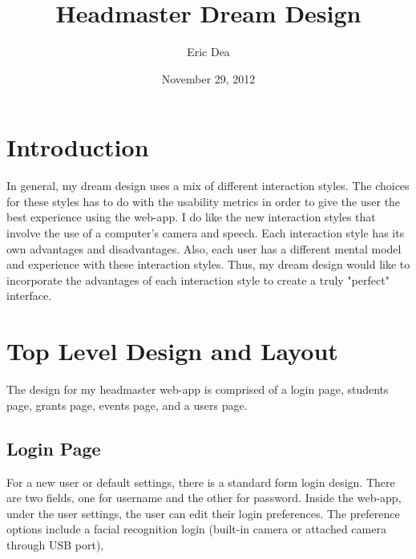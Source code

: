 \documentclass{article}
\title{Headmaster Dream Design}
\author{Eric Dea}
\date{November 29, 2012}
\begin{document}
\maketitle


\pagebreak
\tableofcontents

\pagebreak
\listoffigures

\pagebreak

%
%
\section{Introduction}
\label{introduction}

In general, my dream design uses a mix of different interaction styles.  The choices for these styles has to do with the usability metrics in order to give the user the best experience using the web-app.  I do like the new interaction styles that involve the use of a computer's camera and speech.  Each interaction style has its own advantages and disadvantages.  Also, each user has a different mental model and experience with these interaction styles.  Thus, my dream design would like to incorporate the advantages of each interaction style to create a truly "perfect" interface.

\section{Top Level Design and Layout}

The design for my headmaster web-app is comprised of a login page, students page, grants page, events page, and a users page.

\subsection{Login Page}

For a new user or default settings, there is a standard form login design.  There are two fields, one for username and the other for password.  Inside the web-app, under the user settings, the user can edit their login preferences.  The preference options include a facial recognition login (built-in camera or attached camera through USB port), 
\end{document}
